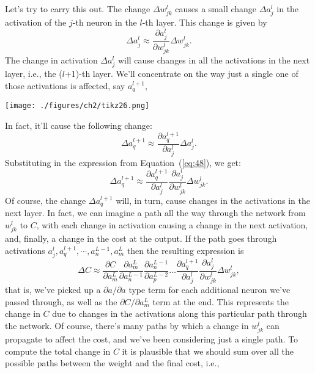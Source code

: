 \documentclass[a4paper,twoside,10pt]{book}
\begin{document}
Let's try to carry this out. The change $\Delta{}w^l_{jk}$ causes a small change $\Delta{}a^l_j$ in the activation of the $j$-th neuron in the $l$-th layer. This change is given by
\begin{equation}
	\Delta a^l_j \approx \frac{\partial a^l_j}{\partial w^l_{jk}} \Delta w^l_{jk}.
	\tag{48}\label{eq:48}
\end{equation}
The change in activation $\Delta{}a^l_j$ will cause changes in all the activations in the next layer, i.e., the ($l$+1)-th layer. We'll concentrate on the way just a single one of those activations is affected, say $a^{l+1}_q$,
\begin{center}
	\texttt{[image: ./figures/ch2/tikz26.png]}
\end{center}
In fact, it'll cause the following change:
\begin{equation}
	\Delta a^{l+1}_q \approx \frac{\partial a^{l+1}_q}{\partial a^l_j} \Delta a^l_j.
	\tag{49}\label{eq:49}
\end{equation}%
Substituting in the expression from Equation~(\ref{eq:48}), we get:
\begin{equation}
	\Delta a^{l+1}_q \approx \frac{\partial a^{l+1}_q}{\partial a^l_j} \frac{\partial a^l_j}{\partial w^l_{jk}} \Delta w^l_{jk}.
	\tag{50}\label{eq:50}
\end{equation}
Of course, the change $\Delta{}a^{l+1}_q$ will, in turn, cause changes in the activations in the next layer. In fact, we can imagine a path all the way through the network from $w^l_{jk}$ to $C$, with each change in activation causing a change in the next activation, and, finally, a change in the cost at the output. If the path goes through activations $a^l_j,a^{l+1}_q,\cdots,a^{L-1}_n,a^L_m$ then the resulting expression is
\begin{equation}
	\Delta C \approx \frac{\partial C}{\partial a^L_m} 
	\frac{\partial a^L_m}{\partial a^{L-1}_n}
	\frac{\partial a^{L-1}_n}{\partial a^{L-2}_p} \ldots
	\frac{\partial a^{l+1}_q}{\partial a^l_j}
	\frac{\partial a^l_j}{\partial w^l_{jk}} \Delta w^l_{jk},
	\tag{51}\label{eq:51}
\end{equation}
that is, we've picked up a $\partial{}a/\partial{}a$ type term for each additional neuron we've passed through, as well as the $\partial{}C/\partial{}a^L_m$ term at the end. This represents the change in $C$ due to changes in the activations along this particular path through the network. Of course, there's many paths by which a change in $w^l_{jk}$ can propagate to affect the cost, and we've been considering just a single path. To compute the total change in $C$ it is plausible that we should sum over all the possible paths between the weight and the final cost, i.e.,
\end{document}
